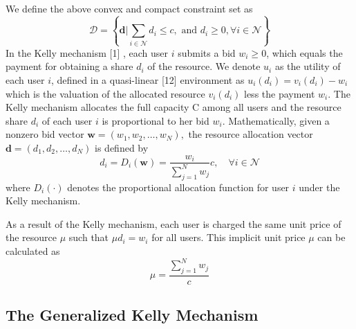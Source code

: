 We define the above convex and compact constraint set as
$$
\mathscr{D}=\left\{\mathbf{d} | \sum_{i \in \mathcal{N}} d_{i} \leq c, \text { and } d_{i} \geq 0, \forall i \in \mathcal{N}\right\}
$$
In the Kelly mechanism [1] , each user $i$ submits a bid $w_{i} \geq 0$, which equals the payment for obtaining a share $d_{i}$ of the resource. We denote $u_{i}$ as the utility of each user $i$, defined in a quasi-linear [12] environment as $u_{i}\left(d_{i}\right)=v_{i}\left(d_{i}\right)-w_{i}$
which is the valuation of the allocated resource $v_{i}\left(d_{i}\right)$ less the payment $w_{i}$. The Kelly mechanism allocates the full capacity
C among all users and the resource share $d_{i}$ of each user $i$ is proportional to her bid $w_{i} .$ Mathematically, given a nonzero bid vector $\mathbf{w}=\left(w_{1}, w_{2}, \ldots, w_{N}\right),$ the resource allocation vector $\mathbf{d}=\left(d_{1}, d_{2}, \ldots, d_{N}\right)$ is defined by
$$
d_{i}=D_{i}(\mathbf{w})=\frac{w_{i}}{\sum_{j=1}^{N} w_{j}} c, \quad \forall i \in \mathcal{N}
$$
where $D_{i}(\cdot)$ denotes the proportional allocation function for user $i$ under the Kelly mechanism.

As a result of the Kelly mechanism, each user is charged the same unit price of the resource $\mu$ such that $\mu d_{i}=w_{i}$ for all users. This implicit unit price $\mu$ can be calculated as
$$
\mu=\frac{\sum_{j=1}^{N} w_{j}}{c}
$$

\subsection{The Generalized Kelly Mechanism}

